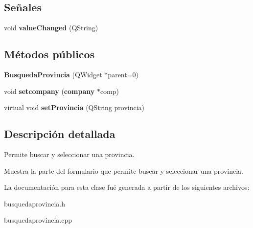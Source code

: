 \subsection*{Se\~{n}ales}
\begin{CompactItemize}
\item 
void {\bf value\-Changed} (QString)\label{classBusquedaProvincia_l0}

\end{CompactItemize}
\subsection*{M\'{e}todos p\'{u}blicos}
\begin{CompactItemize}
\item 
{\bf Busqueda\-Provincia} (QWidget $\ast$parent=0)\label{classBusquedaProvincia_a0}

\item 
void {\bf setcompany} ({\bf company} $\ast$comp)\label{classBusquedaProvincia_a1}

\item 
virtual void {\bf set\-Provincia} (QString provincia)\label{classBusquedaProvincia_a2}

\end{CompactItemize}


\subsection{Descripci\'{o}n detallada}
Permite buscar y seleccionar una provincia. 

Muestra la parte del formulario que permite buscar y seleccionar una provincia. 



La documentaci\'{o}n para esta clase fu\'{e} generada a partir de los siguientes archivos:\begin{CompactItemize}
\item 
busquedaprovincia.h\item 
busquedaprovincia.cpp\end{CompactItemize}
